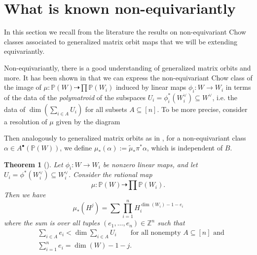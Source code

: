 \documentclass[12pt]{amsart}
\newcommand{\mb}{\mathbb}
\newcommand{\ol}{\overline}
\newcommand{\wt}{\widetilde}
\theoremstyle{plain}
\newtheorem{Thm}{Theorem}[section]
\theoremstyle{definition}
\theoremstyle{remark}
\begin{document}

\section{What is known non-equivariantly}\label{noneqsection}
In this section we recall from the literature the results on non-equivariant Chow classes associated to generalized matrix orbit maps that we will be extending equivariantly.

Non-equivariantly, there is a good understanding of generalized matrix orbits and more. It has been shown in \cite{Binglin} that we can express the non-equivariant Chow class of the image of $\mu:\mb{P}(W) \dashrightarrow \prod \mb{P}(W_i)$ induced by linear maps $\phi_i:W \to W_i$ in terms of the data of the \emph{polymatroid} of the subspaces $U_i=\phi_i^*(W_i^\vee) \subseteq W^\vee$, i.e. the data of $\dim(\sum_{i \in A} U_i)$ for all subsets $A \subseteq [n]$. To be more precise, consider a resolution of $\mu$ given by the diagram
\begin{center}
\end{center}
Then analogously to generalized matrix orbits as in , for a non-equivariant class $\alpha\in A^\bullet(\mb{P}(W))$, we define $\mu_*(\alpha):=\wt{\mu}_*\pi^*\alpha$, which is independent of $B$.

\begin{Thm}[{\cite[Theorem 1.1]{Binglin}}]\label{section5binglin}
Let $\phi_i:W \to W_i$ be nonzero linear maps, and let $U_i = \phi^*(W_i^\vee)\subseteq W_i^\vee $. Consider the rational map $$\mu:\mb{P}(W) \dashrightarrow \prod \mb{P}(W_i).$$ Then we have $$\mu_*(H^j)=\sum \prod_{i=1}^n H_i^{\dim(W_i)-1-e_i}$$ where the sum is over all tuples $(e_1,\ldots,e_n) \in \mb{Z}^n$ such that
\begin{align*}
&\sum_{i \in A}e_i < \dim \sum_{i \in A} U_i\qquad\text{for all nonempty $A\subseteq [n]$ and}\\
&\sum_{i=1}^n e_i=\dim(W)-1-j.
\end{align*}
\end{Thm}
\end{document}
